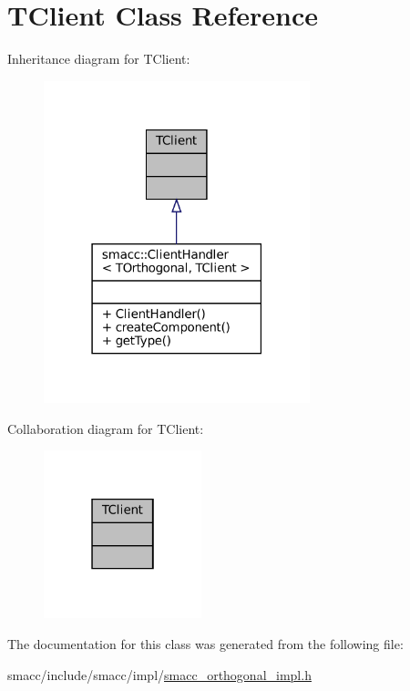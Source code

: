 \hypertarget{classTClient}{}\section{T\+Client Class Reference}
\label{classTClient}


Inheritance diagram for T\+Client\+:
\nopagebreak
\begin{figure}[H]
\begin{center}
\leavevmode
\includegraphics[width=219pt]{classTClient__inherit__graph}
\end{center}
\end{figure}


Collaboration diagram for T\+Client\+:
\nopagebreak
\begin{figure}[H]
\begin{center}
\leavevmode
\includegraphics[width=130pt]{classTClient__coll__graph}
\end{center}
\end{figure}


The documentation for this class was generated from the following file\+:\begin{DoxyCompactItemize}
\item 
smacc/include/smacc/impl/\hyperlink{smacc__orthogonal__impl_8h}{smacc\+\_\+orthogonal\+\_\+impl.\+h}\end{DoxyCompactItemize}
